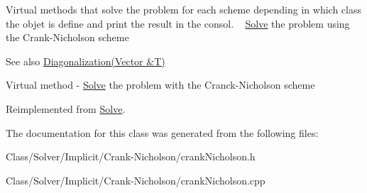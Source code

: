 Virtual methods that solve the problem for each scheme depending in which class the objet is define and print the result in the consol. ~\newline
 \hyperlink{class_solve}{Solve} the problem using the Crank-\/\+Nicholson scheme \begin{DoxySeeAlso}{See also}
\hyperlink{class_implicit_a572fff2232977c83c432f993f37a7853}{Diagonalization(\+Vector \&\+T)}
\end{DoxySeeAlso}
Virtual method -\/ \hyperlink{class_solve}{Solve} the problem with the Cranck-\/\+Nicholson scheme 

Reimplemented from \hyperlink{class_solve_a1a56722993fdabea9928637d7dd8a2c7}{Solve}.



The documentation for this class was generated from the following files\+:\begin{DoxyCompactItemize}
\item 
Class/\+Solver/\+Implicit/\+Crank-\/\+Nicholson/crank\+Nicholson.\+h\item 
Class/\+Solver/\+Implicit/\+Crank-\/\+Nicholson/crank\+Nicholson.\+cpp\end{DoxyCompactItemize}
